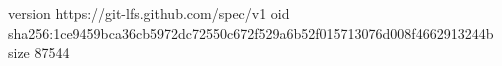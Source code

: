 version https://git-lfs.github.com/spec/v1
oid sha256:1ce9459bca36cb5972dc72550c672f529a6b52f015713076d008f4662913244b
size 87544
